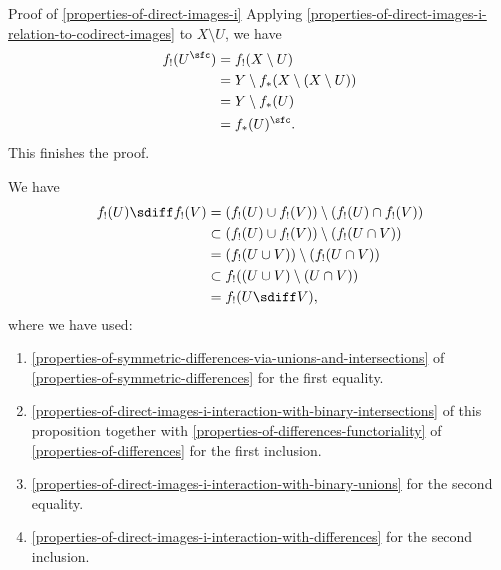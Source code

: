 \begin{Proof}{Proof of \cref{properties-of-direct-images-i}}
    Applying \cref{properties-of-direct-images-i-relation-to-codirect-images} to $X\setminus U$, we have
    \begin{align*}
        f_{!}(U^{\sfc}) &= f_{!}(X\setminus U)\\
                        &= Y\setminus f_{*}(X\setminus(X\setminus U))\\
                        &= Y\setminus f_{*}(U)\\
                        &= f_{*}(U)^{\sfc}.
    \end{align*}
    This finishes the proof.

    We have
    \begin{align*}
        f_{!}(U)\sdiff f_{!}(V) &=       (f_{!}(U)\cup f_{!}(V))\setminus(f_{!}(U)\cap f_{!}(V))\\
                                &\subset (f_{!}(U)\cup f_{!}(V))\setminus(f_{!}(U\cap V))\\
                                &=       (f_{!}(U\cup V))\setminus(f_{!}(U\cap V))\\
                                &\subset f_{!}((U\cup V)\setminus(U\cap V))\\
                                &=       f_{!}(U\sdiff V),
    \end{align*}
    where we have used:
    \begin{enumerate}
        \item\label{proof-of-properties-of-direct-images-i-interaction-with-symmetric-differences-of-1}\cref{properties-of-symmetric-differences-via-unions-and-intersections} of \cref{properties-of-symmetric-differences} for the first equality.
        \item\label{proof-of-properties-of-direct-images-i-interaction-with-symmetric-differences-of-2}\cref{properties-of-direct-images-i-interaction-with-binary-intersections} of this proposition together with \cref{properties-of-differences-functoriality} of \cref{properties-of-differences} for the first inclusion.
        \item\label{proof-of-properties-of-direct-images-i-interaction-with-symmetric-differences-of-3}\cref{properties-of-direct-images-i-interaction-with-binary-unions} for the second equality.
        \item\label{proof-of-properties-of-direct-images-i-interaction-with-symmetric-differences-of-4}\cref{properties-of-direct-images-i-interaction-with-differences} for the second inclusion.

\end{enumerate}
\end{Proof}
